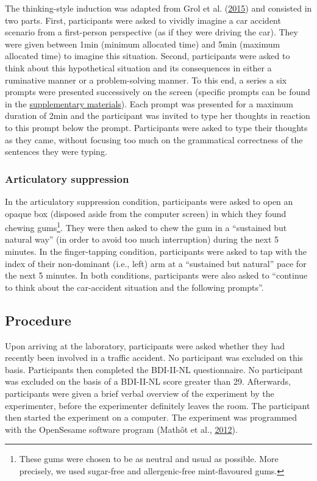 \documentclass[a4paper,12pt,twoside,onecolumn,openright,final,oldfontcommands]{memoir}
\let\rmarkdownfootnote\footnote%
\def\footnote{\protect\rmarkdownfootnote}
\begin{document}
The thinking-style induction was adapted from Grol et al. (\protect\hyperlink{ref-grol_effects_2015}{2015}) and consisted in two parts. First, participants were asked to vividly imagine a car accident scenario from a first-person perspective (as if they were driving the car). They were given between 1min (minimum allocated time) and 5min (maximum allocated time) to imagine this situation. Second, participants were asked to think about this hypothetical situation and its consequences in either a ruminative manner or a problem-solving manner. To this end, a series a six prompts were presented successively on the screen (specific prompts can be found in the \protect\hyperlink{supp}{supplementary materials}). Each prompt was presented for a maximum duration of 2min and the participant was invited to type her thoughts in reaction to this prompt below the prompt. Participants were asked to type their thoughts as they came, without focusing too much on the grammatical correctness of the sentences they were typing.

\hypertarget{articulatory-suppression}{%
\subsubsection{Articulatory suppression}\label{articulatory-suppression}}

In the articulatory suppression condition, participants were asked to open an opaque box (disposed aside from the computer screen) in which they found chewing gums\footnote{These gums were chosen to be as neutral and usual as possible. More precisely, we used sugar-free and allergenic-free mint-flavoured gums.}. They were then asked to chew the gum in a \enquote{sustained but natural way} (in order to avoid too much interruption) during the next 5 minutes. In the finger-tapping condition, participants were asked to tap with the index of their non-dominant (i.e., left) arm at a \enquote{sustained but natural} pace for the next 5 minutes. In both conditions, participants were also asked to \enquote{continue to think about the car-accident situation and the following prompts}.

\hypertarget{procedure-4}{%
\subsection{Procedure}\label{procedure-4}}

Upon arriving at the laboratory, participants were asked whether they had recently been involved in a traffic accident. No participant was excluded on this basis. Participants then completed the BDI-II-NL questionnaire. No participant was excluded on the basis of a BDI-II-NL score greater than 29. Afterwards, participants were given a brief verbal overview of the experiment by the experimenter, before the experimenter definitely leaves the room. The participant then started the experiment on a computer. The experiment was programmed with the OpenSesame software program (Mathôt et al., \protect\hyperlink{ref-mathot_opensesame_2012}{2012}).
\end{document}
